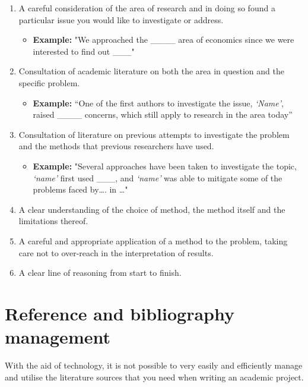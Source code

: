 \documentclass[
]{book}
\providecommand{\tightlist}{%
  \setlength{\itemsep}{0pt}\setlength{\parskip}{0pt}}
\begin{document}
\begin{enumerate}
\def\labelenumi{\arabic{enumi}.}
\item
  A careful consideration of the area of research and in doing so found a particular issue you would like to investigate or address.

  \begin{itemize}
  \tightlist
  \item
    \textbf{Example:} "We approached the \_\_\_\_ area of economics since we were interested to find out \_\_\_"
  \end{itemize}
\item
  Consultation of academic literature on both the area in question and the specific problem.

  \begin{itemize}
  \tightlist
  \item
    \textbf{Example:} ``One of the first authors to investigate the issue, \emph{`Name'}, raised \_\_\_\_ concerns, which still apply to research in the area today''
  \end{itemize}
\item
  Consultation of literature on previous attempts to investigate the problem and the methods that previous researchers have used.

  \begin{itemize}
  \tightlist
  \item
    \textbf{Example:} "Several approaches have been taken to investigate the topic, \emph{`name'} first used \_\_\_, and \emph{`name'} was able to mitigate some of the problems faced by\ldots. in \ldots"
  \end{itemize}
\item
  A clear understanding of the choice of method, the method itself and the limitations thereof.
\item
  A careful and appropriate application of a method to the problem, taking care not to over-reach in the interpretation of results.
\item
  A clear line of reasoning from start to finish.
\end{enumerate}

\hypertarget{reference-and-bibliography-management}{%
\chapter{Reference and bibliography management}\label{reference-and-bibliography-management}}

With the aid of technology, it is not possible to very easily and efficiently manage and utilise the literature sources that you need when writing an academic project.
\end{document}
